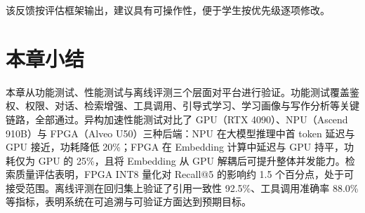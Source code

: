 该反馈按评估框架输出，建议具有可操作性，便于学生按优先级逐项修改。

\section{本章小结}
本章从功能测试、性能测试与离线评测三个层面对平台进行验证。功能测试覆盖鉴权、权限、对话、检索增强、工具调用、引导式学习、学习画像与写作分析等关键链路，全部通过。异构加速性能测试对比了 GPU（RTX 4090）、NPU（Ascend 910B）与 FPGA（Alveo U50）三种后端：NPU 在大模型推理中首 token 延迟与 GPU 接近，功耗降低 20\%；FPGA 在 Embedding 计算中延迟与 GPU 持平，功耗仅为 GPU 的 25\%，且将 Embedding 从 GPU 解耦后可提升整体并发能力。检索质量评估表明，FPGA INT8 量化对 Recall@5 的影响约 1.5 个百分点，处于可接受范围。离线评测在回归集上验证了引用一致性 92.5\%、工具调用准确率 88.0\% 等指标，表明系统在可追溯与可验证方面达到预期目标。
